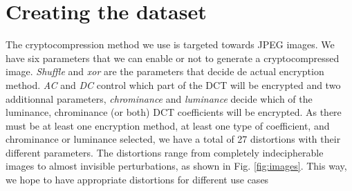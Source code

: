 \documentclass{article}
\begin{document}
\section{Creating the dataset}
\label{sec:dataset}
The cryptocompression method we use is targeted towards JPEG images. We have six parameters that we can enable or not to generate a cryptocompressed image. \textit{Shuffle} and \textit{xor} are the parameters that decide de actual encryption method. \textit{AC} and \textit{DC} control which part of the DCT will be encrypted and two additionnal parameters, \textit{chrominance} and \textit{luminance} decide which of the luminance, chrominance (or both) DCT coefficients will be encrypted. As there must be at least one encryption method, at least one type of coefficient, and chrominance or luminance selected, we have a total of 27 distortions with their different parameters. The distortions range from completely indecipherable images to almost invisible perturbations, as shown in Fig. \ref{fig:images}. This way, we hope to have appropriate distortions for different use cases
\end{document}
